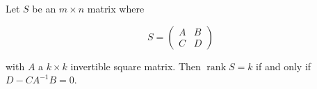 Let $S$ be an $m \times n$ matrix where

$$S = \begin{pmatrix} A & B \\ C & D \end{pmatrix}$$

with $A$ a $k \times k$ invertible square matrix. Then $\operatorname{rank} S = k$ if and only if $D - CA^{-1}B = 0$.

